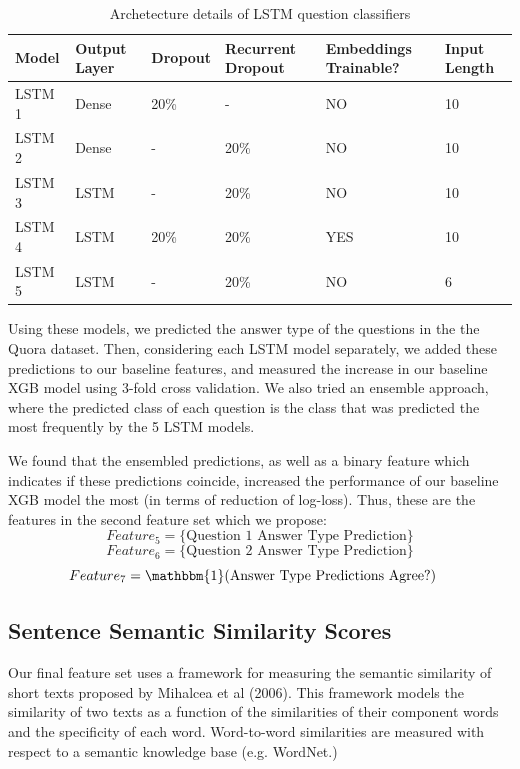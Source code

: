 \documentclass[letterpaper, 10 pt, conference]{ieeeconf}  %
\begin{document}
\begin{table}[]
\centering
\caption{Archetecture details of LSTM question classifiers }
\label{my-label}
\begin{tabular}{|p{10mm}|p{10mm}|p{10mm}|p{10mm}|p{14mm}|p{8mm}|}
\hline
Model  & Output Layer & Dropout  & Recurrent Dropout & Embeddings Trainable? & Input Length \\ \hline
LSTM 1 & Dense             & 20\%                   & -                 & NO                    & 10           \\
LSTM 2 & Dense             & -                      & 20\%              & NO                    & 10           \\
LSTM 3 & LSTM              & -                      & 20\%              & NO                    & 10           \\
LSTM 4 & LSTM              & 20\%                   & 20\%              & YES                   & 10           \\
LSTM 5 & LSTM              & -                      & 20\%              & NO                    & 6            \\ \hline
\end{tabular}
\end{table}

Using these models, we predicted the answer type of the questions in the the Quora dataset. Then, considering each LSTM model separately, we added these predictions to our baseline features, and measured the increase in our baseline XGB model using 3-fold cross validation. We also tried an ensemble approach, where the predicted class of each question is the class that was predicted the most frequently by the 5 LSTM models.

We found that the ensembled predictions, as well as a binary feature which indicates if these predictions coincide, increased the performance of our baseline XGB model the most (in terms of reduction of log-loss). Thus, these are the features in the second feature set which we propose: 
$$
Feature_5 = \text{\{Question 1 Answer Type Prediction\}}
$$
$$
Feature_6 = \text{\{Question 2 Answer Type Prediction\}}
$$
$$
Feature_7 = \mathbbm{1}(\text{Answer Type Predictions Agree?})\quad
$$
\subsection{Sentence Semantic Similarity Scores}

Our final feature set uses a framework for measuring the semantic similarity of short texts proposed by Mihalcea et al (2006). This framework models the similarity of two texts as a function of the similarities of their component words and the specificity of each word. Word-to-word similarities are measured with respect to a semantic knowledge base (e.g. WordNet.)
\end{document}
